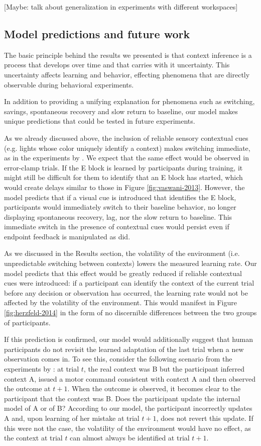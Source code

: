 \documentclass[a4paper,doc,floatsintext,natbib]{apa6}
\def \fref #1{Figure \ref{#1}}     %
\begin{document}
[Maybe: talk about generalization in experiments with different workspaces]

\subsection{Model predictions and future work}
The basic principle behind the results we presented is that context inference is a process that develops over time and that carries with it uncertainty. This uncertainty affects learning and behavior, effecting phenomena that are directly observable during behavioral experiments.

In addition to providing a unifying explanation for phenomena such as switching, savings, spontaneous recovery and slow return to baseline, our model makes unique predictions that could be tested in future experiments.

As we already discussed above, the inclusion of reliable sensory contextual cues (e.g. lights whose color uniquely identify a context) makes switching immediate, as in the experiments by \cite{Kim_Neural_2015}. We expect that the same effect would be observed in error-clamp trials. If the E block is learned by participants during training, it might still be difficult for them to identify that an E block has started, which would create delays similar to those in \fref{fig:vaswani-2013}. However, the model predicts that if a visual cue is introduced that identifies the E block, participants would immediately switch to their baseline behavior, no longer displaying spontaneous recovery, lag, nor the slow return to baseline. This immediate switch in the presence of contextual cues would persist even if endpoint feedback is manipulated as \cite{Vaswani_Decay_2013} did.

As we discussed in the Results section, the volatility of the environment (i.e. unpredictable switching between contexts) lowers the measured learning rate. Our model predicts that this effect would be greatly reduced if reliable contextual cues were introduced: if a participant can identify the context of the current trial before any decision or observation has occurred, the learning rate would not be affected by the volatility of the environment. This would manifest in \fref{fig:herzfeld-2014} in the form of no discernible differences between the two groups of participants.

If this prediction is confirmed, our model would additionally suggest that human participants do not revisit the learned adaptation of the last trial when a new observation comes in. To see this, consider the following scenario from the experiments by \cite{Herzfeld_memory_2014}: at trial $t$, the real context was B but the participant inferred context A, issued a motor command consistent with context A and then observed the outcome at $t + 1$. When the outcome is observed, it becomes clear to the participant that the context was B. Does the participant update the internal model of A or of B? According to our model, the participant incorrectly updates A and, upon learning of her mistake at trial $t+1$, does not revert this update. If this were not the case, the volatility of the environment would have no effect, as the context at trial $t$ can almost always be identified at trial $t+1$.
\end{document}
